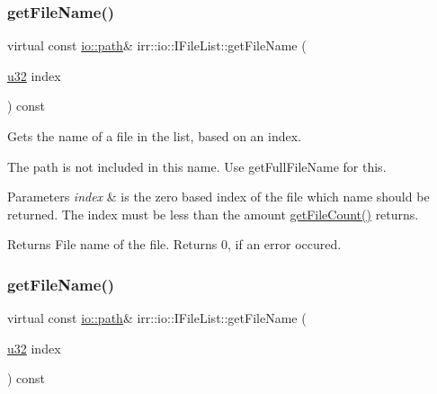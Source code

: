 \subsubsection{\texorpdfstring{get\+File\+Name()}{getFileName()}\hspace{0.1cm}{\footnotesize\ttfamily [1/2]}}
{\footnotesize\ttfamily virtual const \hyperlink{namespaceirr_1_1io_a6468281622ce3a1c46b72e19f32dded5}{io\+::path}\& irr\+::io\+::\+I\+File\+List\+::get\+File\+Name (\begin{DoxyParamCaption}\item[{\hyperlink{namespaceirr_a0416a53257075833e7002efd0a18e804}{u32}}]{index }\end{DoxyParamCaption}) const\hspace{0.3cm}{\ttfamily [pure virtual]}}



Gets the name of a file in the list, based on an index. 

The path is not included in this name. Use get\+Full\+File\+Name for this. 
\begin{DoxyParams}{Parameters}
{\em index} & is the zero based index of the file which name should be returned. The index must be less than the amount \hyperlink{classirr_1_1io_1_1IFileList_a871861be76e18d58274c4580b1d103b9}{get\+File\+Count()} returns. \\
\hline
\end{DoxyParams}
\begin{DoxyReturn}{Returns}
File name of the file. Returns 0, if an error occured. 
\end{DoxyReturn}
\mbox{\label{classirr_1_1io_1_1IFileList_ab4e0330adf34afa3c21e06ff0b4e84d5}} 
\subsubsection{\texorpdfstring{get\+File\+Name()}{getFileName()}\hspace{0.1cm}{\footnotesize\ttfamily [2/2]}}
{\footnotesize\ttfamily virtual const \hyperlink{namespaceirr_1_1io_a6468281622ce3a1c46b72e19f32dded5}{io\+::path}\& irr\+::io\+::\+I\+File\+List\+::get\+File\+Name (\begin{DoxyParamCaption}\item[{\hyperlink{namespaceirr_a0416a53257075833e7002efd0a18e804}{u32}}]{index }\end{DoxyParamCaption}) const\hspace{0.3cm}{\ttfamily [pure virtual]}}



